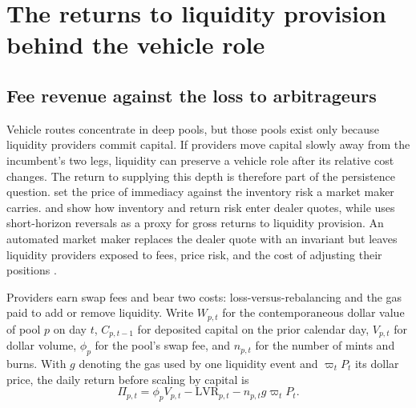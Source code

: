 
\section{The returns to liquidity provision behind the vehicle role}
\label{sec:liquidity}

\subsection{Fee revenue against the loss to arbitrageurs}
\label{sec:liquidity:accounting}

Vehicle routes concentrate in deep pools, but those pools exist only because liquidity providers commit capital. If providers move capital slowly away from the incumbent's two legs, liquidity can preserve a vehicle role after its relative cost changes. The return to supplying this depth is therefore part of the persistence question. \citet{GrossmanMiller1988Liquidity} set the price of immediacy against the inventory risk a market maker carries. \citet{AmihudMendelson1980Dealership} and \citet{HoStoll1981OptimalDealer} show how inventory and return risk enter dealer quotes, while \citet{Nagel2012EvaporatingLiquidity} uses short-horizon reversals as a proxy for gross returns to liquidity provision. An automated market maker replaces the dealer quote with an invariant but leaves liquidity providers exposed to fees, price risk, and the cost of adjusting their positions \citep{LeharParlour2024Uniswap}.

Providers earn swap fees and bear two costs: loss-versus-rebalancing and the gas paid to add or remove liquidity. Write $W_{p,t}$ for the contemporaneous dollar value of pool $p$ on day $t$, $C_{p,t-1}$ for deposited capital on the prior calendar day, $V_{p,t}$ for dollar volume, $\phi_p$ for the pool's swap fee, and $n_{p,t}$ for the number of mints and burns. With $g$ denoting the gas used by one liquidity event and $\varpi_tP_t$ its dollar price, the daily return before scaling by capital is
\begin{equation}
\Pi_{p,t}=\phi_pV_{p,t}-\mathrm{LVR}_{p,t}-n_{p,t}g\varpi_tP_t.
\label{eq:rent}
\end{equation}

